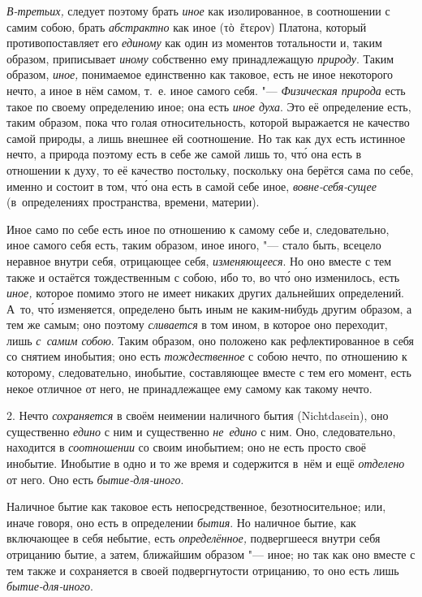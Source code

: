 {\em В-третьих,} следует поэтому брать {\em иное} как изолированное,
в соотношении с самим собою, брать {\em абстрактно}
как иное (\textgreek{τὸ~ἕτερον}) Платона, который
противопоставляет его {\em единому} как один из
моментов тотальности и, таким образом, приписывает
{\em иному} собственно ему принадлежащую {\em природу}. Таким образом,
{\em иное,} понимаемое единственно как таковое, есть
не иное некоторого нечто, а иное в нём самом, т.~е. иное самого себя.
"--- {\em Физическая природа} есть такое по своему
определению иное; она есть {\em иное духа}. Это её
определение есть, таким образом, пока что голая относительность, которой
выражается не качество самой природы, а лишь внешнее ей соотношение. Но так
как дух есть истинное нечто, а природа поэтому есть в себе же самой лишь
то, чт\'{о} она есть в отношении к духу, то её качество постольку, поскольку
она берётся сама по себе, именно и состоит в том, чт\'{о} она есть в самой себе
иное, {\em вовне-себя-сущее} (в~определениях пространства, времени, материи).

Иное само по себе есть иное по отношению к самому себе и, следовательно, иное самого
себя есть, таким образом, иное иного, "--- стало быть, всецело неравное
внутри себя, отрицающее себя, {\em изменяющееся}. Но
оно вместе с тем также и остаётся тождественным с собою, ибо то, во чт\'{о} оно
изменилось, есть {\em иное,} которое помимо этого не
имеет никаких других дальнейших определений. А~то, чт\'{о} изменяется,
определено быть иным не каким-нибудь другим образом, а тем же самым; оно
поэтому {\em сливается} в том ином, в которое оно
переходит, лишь {\em с~самим собою}. Таким образом, оно
положено как рефлектированное в себя со снятием инобытия; оно есть
{\em тождественное} с собою нечто, по отношению к
которому, следовательно, инобытие, составляющее вместе с тем его момент,
есть некое отличное от него, не принадлежащее ему самому как такому нечто.

2. Нечто {\em сохраняется} в своём неимении наличного
бытия (Nicht\-dasein), оно существенно {\em едино} с ним
и существенно {\em не~едино} с ним. Оно, следовательно,
находится в {\em соотношении} со своим инобытием; оно не есть просто
своё инобытие. Инобытие в одно и то же время и содержится в~нём
и ещё {\em отделено} от него. Оно есть {\em бытие-для-иного}.

Наличное бытие как таковое есть непосредственное, безотносительное; или,
иначе говоря, оно есть в определении {\em бытия}. Но
наличное бытие, как включающее в себя небытие, есть
{\em определённое,} подвергшееся внутри себя отрицанию
бытие, а затем, ближайшим образом "--- иное; но так как оно вместе с тем
также и сохраняется в своей подвергнутости отрицанию, то оно есть лишь
{\em бытие-для-иного}.

